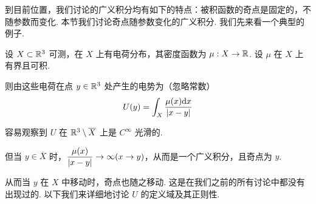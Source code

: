 
到目前位置，我们讨论的广义积分均有如下的特点：被积函数的奇点是固定的，不随参数而变化. 本节我们讨论奇点随参数变化的广义积分. 我们先来看一个典型的例子.

\begin{example}
    设 $X\subset\mathbb{R}^3$ 可测，在 $X$ 上有电荷分布，其密度函数为 $\mu:X\to\mathbb{R}$. 设 $\mu$ 在 $X$ 上有界且可积.

    则由这些电荷在点 $y\in\mathbb{R}^3$ 处产生的电势为（忽略常数）
$$
U(y)=\int_X\frac{\mu(x)\mathrm{d} x}{\left\lvert{x-y}\right\rvert}
$$

    容易观察到 $U$ 在 $\mathbb{R}^3\setminus\overline{X}$ 上是 $C^{\infty}$ 光滑的.

    但当 $y\in\overline{X}$ 时，$\dfrac{\mu(x)}{\left\lvert{x-y}\right\rvert}\to\infty(x\to y)$，从而是一个广义积分，且奇点为 $y$.

    从而当 $y$ 在 $X$ 中移动时，奇点也随之移动. 这是在我们之前的所有讨论中都没有出现过的. 以下我们来详细地讨论 $U$ 的定义域及其正则性.
\end{example}

